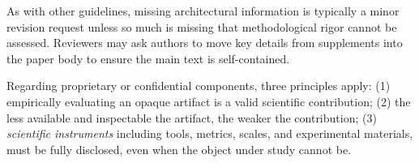 As with other guidelines, missing architectural information is typically a minor revision request unless so much is missing that methodological rigor cannot be assessed. Reviewers may ask authors to move key details from supplements into the paper body to ensure the main text is self-contained.

Regarding proprietary or confidential components, three principles apply: (1) empirically evaluating an opaque artifact is a valid scientific contribution; (2) the less available and inspectable the artifact, the weaker the contribution; (3) \textit{scientific instruments} including tools, metrics, scales, and experimental materials,  must be fully disclosed, even when the object under study cannot be.